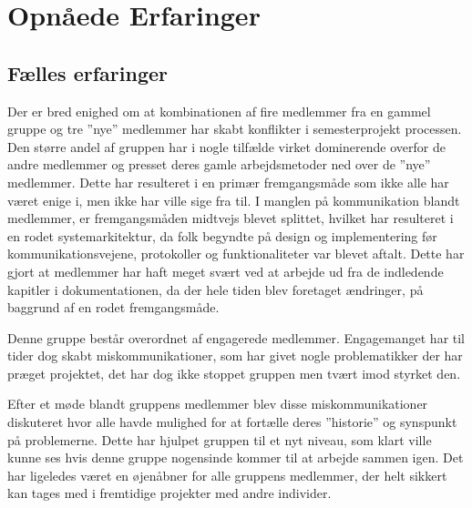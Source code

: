 \chapter{Opnåede Erfaringer}
\section{Fælles erfaringer}
Der er bred enighed om at kombinationen af fire medlemmer fra en gammel gruppe og tre ''nye'' medlemmer har skabt konflikter i semesterprojekt processen. Den større andel af gruppen har i nogle tilfælde virket dominerende overfor de andre medlemmer og presset deres gamle arbejdsmetoder ned over de ''nye'' medlemmer. Dette har resulteret i en primær fremgangsmåde som ikke alle har været enige i, men ikke har ville sige fra til. I manglen på kommunikation blandt medlemmer, er fremgangsmåden midtvejs blevet splittet, hvilket har resulteret i en rodet systemarkitektur, da folk begyndte på design og implementering før kommunikationsvejene, protokoller og funktionaliteter var blevet aftalt. Dette har gjort at medlemmer har haft meget svært ved at arbejde ud fra de indledende kapitler i dokumentationen, da der hele tiden blev foretaget ændringer, på baggrund af en rodet fremgangsmåde.

Denne gruppe består overordnet af engagerede medlemmer. Engagemanget har til tider dog skabt miskommunikationer, som har givet nogle problematikker der har præget projektet, det har dog ikke stoppet gruppen men tvært imod styrket den.

Efter et møde blandt gruppens medlemmer blev disse miskommunikationer diskuteret hvor alle havde mulighed for at fortælle deres ''historie'' og synspunkt på problemerne. Dette har hjulpet gruppen til et nyt niveau, som klart ville kunne ses hvis denne gruppe nogensinde kommer til at arbejde sammen igen. Det har ligeledes været en øjenåbner for alle gruppens medlemmer, der helt sikkert kan tages med i fremtidige projekter med andre individer.









\clearpage